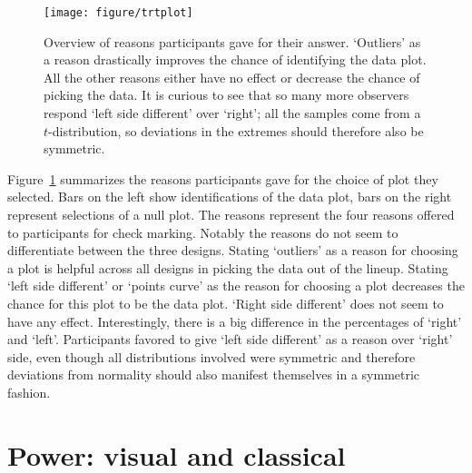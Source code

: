 \documentclass{article}\usepackage[]{graphicx}\usepackage[]{color}
\newenvironment{knitrout}{}{} %
\newcommand{\hh}[1]{{\color{magenta} #1}}
\newcommand{\hhnote}[1]{\todo[inline,color=magenta!40]{#1}}
\begin{document}
\begin{figure}[hbt]
\centering
\begin{knitrout}
\color{fgcolor}
\texttt{[image: figure/trtplot]} 

\end{knitrout}

\caption{\label{fig:choices}Overview of reasons participants gave for  their answer. `Outliers' as a reason drastically improves the chance of identifying the data plot. All the other reasons either have no effect or decrease the chance of picking the data. It is curious to see that so many more observers respond `left side different' over `right';  all the samples  come from a  $t$-distribution, so deviations in the extremes should therefore also be symmetric.}
\end{figure}

\hh{Figure~\ref{fig:choices} summarizes the reasons participants gave for the choice of plot they selected. Bars on the left show  identifications of the data plot, bars on the right represent selections of a null plot. The reasons represent the four reasons offered  to participants for check marking. Notably the reasons do not seem to differentiate between the three designs. Stating `outliers' as a reason for choosing a plot is helpful across all designs in picking the data out of the lineup. Stating `left side different' or `points curve'  as the reason for choosing a plot decreases the chance for this plot to be the data plot. `Right side different' does not seem to have any effect. Interestingly, there is a big difference in the percentages of `right' and `left'. Participants favored to give `left side different' as a reason over `right' side, even though all distributions involved were symmetric and therefore deviations from normality should also manifest themselves in a symmetric fashion.}


\section{Power: visual and classical}\label{sec:power2}
\end{document}
